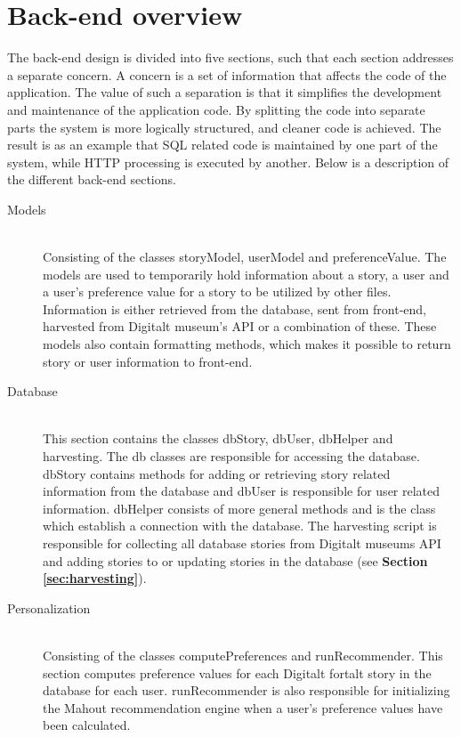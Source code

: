 \section{Back-end overview}
The back-end design is divided into five sections, such that each section addresses a separate concern. A concern is a set of information that affects the code of the application. The value of such a separation is that it simplifies the development and maintenance of the application code. By splitting the code into separate parts the system is more logically structured, and cleaner code is achieved. The result is as an example that SQL related code is maintained by one part of the system, while HTTP processing is executed by another. Below is a description of the different back-end sections.

\begin{description}
	\item[Models] \hfill \\
	Consisting of the classes storyModel, userModel and preferenceValue. The models are used to temporarily hold information about a story, a user and a user's preference value for a story to be utilized by other files. Information is either retrieved from the database, sent from front-end, harvested from Digitalt museum's API or a combination of these. These models also contain formatting methods, which makes it possible to return story or user information to front-end.
	
	\item[Database] \hfill \\
	This section contains the classes dbStory, dbUser, dbHelper and harvesting. The db classes are responsible for accessing the database. dbStory contains methods for adding or retrieving story related information from the database and dbUser is responsible for user related information. dbHelper consists of more general methods and is the class which establish a connection with the database. The harvesting script is responsible for collecting all database stories from Digitalt museums API and adding stories to or updating stories in the database (see \textbf{Section \ref{sec:harvesting}}).
	
	\item[Personalization] \hfill \\
	Consisting of the classes computePreferences and runRecommender. This section computes preference values for each Digitalt fortalt story in the database for each user. runRecommender is also responsible for initializing the Mahout recommendation engine when a user's preference values have been calculated.
	

\end{description}
